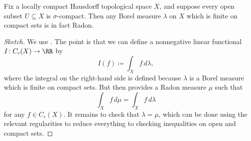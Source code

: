 \documentclass[../notes.tex]{subfiles}
\begin{document}
\begin{proposition}
	Fix a locally compact Hausdorff topological space $X$, and suppose every open subset $U\subseteq X$ is $\sigma$-compact. Then any Borel measure $\lambda$ on $X$ which is finite on compact sets is in fact Radon.
\end{proposition}
\begin{proof}[Sketch]
	We use . The point is that we can define a nonnegative linear functional $I\colon C_c(X)\to\RR$ by
	\[I(f)\coloneqq\int_Xf\,d\lambda,\]
	where the integral on the right-hand side is defined because $\lambda$ is a Borel measure which is finite on compact sets. But then  provides a Radon measure $\mu$ such that
	\[\int_Xf\,d\mu=\int_Xf\,d\lambda\]
	for any $f\in C_c(X)$. It remains to check that $\lambda=\mu$, which can be done using the relevant regularities to reduce everything to checking inequalities on open and compact sets.
\end{proof}
\end{document}
